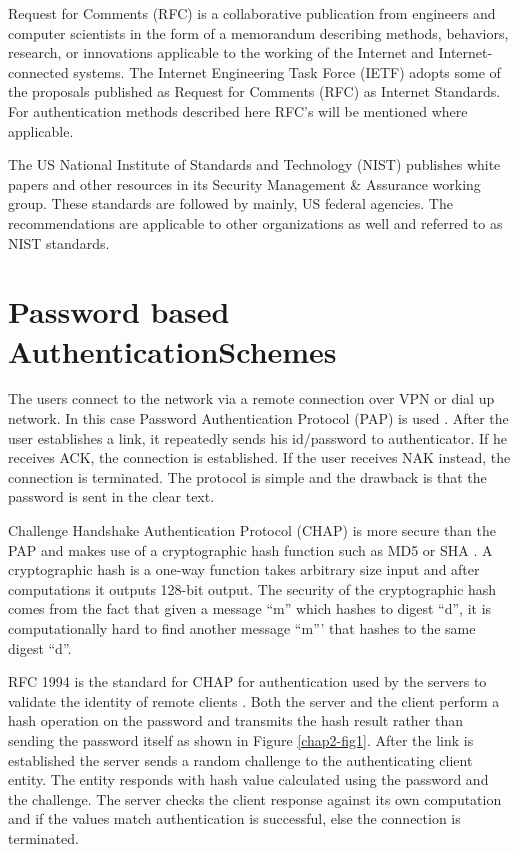 \begin{multicols}{2}
Request for Comments (RFC) is a collaborative publication from engineers and computer scientists in the form of a memorandum describing methods, behaviors, research, or innovations applicable to the working of the Internet and Internet-connected systems. The Internet Engineering Task Force (IETF) adopts some of the proposals published as Request for Comments (RFC) as Internet Standards. For authentication methods described here RFC's will be mentioned where applicable.

The US National Institute of Standards and Technology (NIST) publishes white papers and other resources in its Security Management \& Assurance working group. These standards are followed by mainly, US federal agencies. The recommendations are applicable to other organizations as well and referred to as NIST standards.

\section*{Password based Authentication\hfill\break Schemes}

The users connect to the network via a remote connection over VPN or dial up network. In this case Password Authentication Protocol (PAP) is used \cite{chap2-key4}. After the user establishes a link, it repeatedly sends his id/password to authenticator. If he receives ACK, the connection is established. If the user receives NAK instead, the connection is terminated. The protocol is simple and the drawback is that the password is sent in the clear text.

Challenge Handshake Authentication Protocol (CHAP) is more secure than the PAP and makes use of a cryptographic hash function such as MD5 or SHA \cite{chap2-key1}. A cryptographic hash is a one-way function takes arbitrary size input and after computations it outputs 128-bit output. The security of the cryptographic hash comes from the fact that given a message ``m'' which hashes to digest ``d'', it is computationally hard to find another message ``m''' that hashes to the same digest ``d''.

RFC 1994 is the standard for CHAP for authentication used by the servers to validate the identity of remote clients \cite{chap2-key5}. Both the server and the client perform a hash operation on the password and transmits the hash result rather than sending the password itself as shown in Figure \ref{chap2-fig1}. After the link is established the server sends a random challenge to the authenticating client entity. The entity responds with hash value calculated using the password and the challenge. The server checks the client response against its own computation and if the values match authentication is successful, else the connection is terminated.


\end{multicols}
